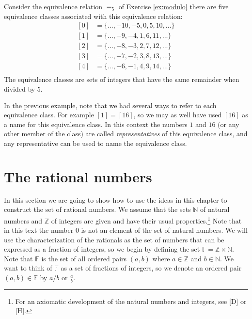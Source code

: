 \begin{example}
Consider the equivalence relation $\equiv_5$ of Exercise \ref{ex:modulo} there are five equivalence classes associated with this equivalence relation:
\begin{equation*}
\begin{split}
[0] &=\{\ldots,-10,-5,0,5,10,\ldots\}\\
[1] &=\{\ldots,-9,-4,1,6,11,\ldots\}\\
[2] &=\{\ldots,-8,-3,2,7,12,\ldots\}\\
[3] &=\{\ldots,-7,-2,3,8,13,\ldots\}\\
[4] &=\{\ldots,-6,-1,4,9,14,\ldots\}\\
\end{split}
\end{equation*}
The equivalence classes are sets of integers that have the same remainder when divided by 5.
\end{example}

In the previous example, note that we had several ways to refer to each equivalence class.  For example $[1]=[16]$, so we may as well have used $[16]$ as a name for this equivalence class.  In this context the numbers $1$ and $16$ (or any other member of the class) are called \emph{representatives} of this equivalence class, and any representative can be used to name the equivalence class.

\section{The rational numbers}

In this section we are going to show how to use the ideas in this chapter to construct the set of rational numbers. We assume that the sets $\mathbb N$ of natural numbers and $\mathbb Z$ of integers are given and have their usual properties.\footnote{For an axiomatic development of the natural numbers and integers, see [D] or [H].} Note that in this text the number $0$ is not an element of the set of natural numbers.  We will use the characterization of the rationals as the set of numbers that can be expressed as a fraction of integers, so we begin by defining the set $\mathbb F=\mathbb Z\times\mathbb N$. Note that $\mathbb F$ is the set of all ordered pairs $(a,b)$ where $a\in\mathbb Z$ and $b\in\mathbb N$. We want to think of $\mathbb F$ as a set of fractions of integers, so we denote an ordered pair $(a,b)\in\mathbb F$ by $a/b$ or $\frac ab$. 

